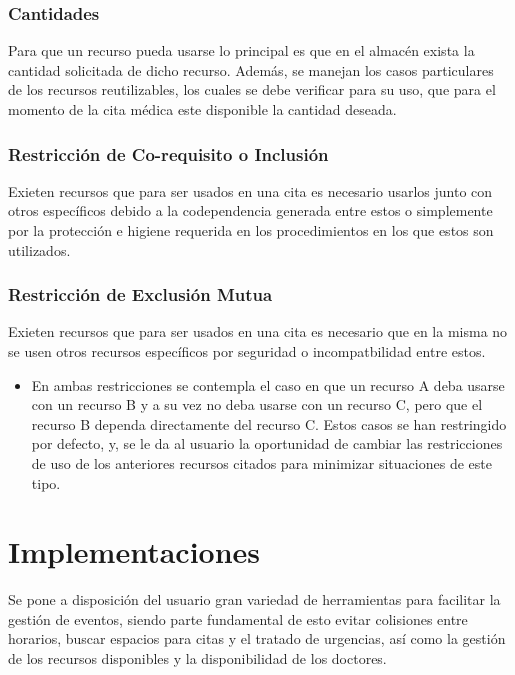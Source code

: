 \documentclass[12pt]{article}
\begin{document}
	\subsubsection{Cantidades}
	
	Para  que un recurso pueda usarse lo principal es que en el almacén exista la cantidad solicitada de dicho recurso. Además, se manejan los casos particulares de los recursos reutilizables, los cuales se debe verificar para su uso, que para el momento de la cita médica este disponible la cantidad deseada.
	
	\subsubsection{Restricción de Co-requisito o Inclusión}
	
	Exieten recursos que para ser usados en una cita es necesario usarlos junto con otros específicos debido a la codependencia generada entre estos o simplemente por la protección e higiene requerida en los procedimientos en los que estos son utilizados.
	
	\subsubsection{Restricción de Exclusión Mutua}
	
	Exieten recursos que para ser usados en una cita es necesario que en la misma no se usen otros recursos específicos por seguridad o incompatbilidad entre estos.
	
    \begin{itemize}
    	\item En ambas restricciones se contempla el caso en que un recurso A deba usarse con un recurso B y a su vez no deba usarse con un recurso C, pero que el recurso B dependa directamente del recurso C. Estos casos se han restringido por defecto, y, se le da al usuario la oportunidad de cambiar  las restricciones de uso de los anteriores recursos citados para minimizar situaciones de este tipo.
    \end{itemize} 
    
	\section{Implementaciones}
	
	Se pone a disposición del usuario gran variedad de herramientas para facilitar la gestión de eventos, siendo parte fundamental de esto evitar colisiones entre horarios, buscar espacios para citas y el tratado de urgencias, así como la gestión de los recursos disponibles y la disponibilidad de los doctores.
	
\end{document}
